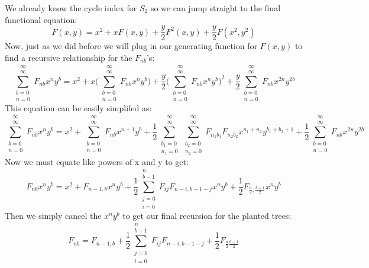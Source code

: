 \documentclass{article}
\begin{document}
We already know the cycle index for \(S_2\) so we can jump straight to the final functional equation:
\begin{equation}
F(x,y)=x^2+ xF(x,y)+\frac{y}{2}F^2(x,y)+\frac{y}{2}F(x^2,y^2)
\end{equation}
Now, just as we did before we will plug in our generating function for \(F(x,y)\) to find a recursive relationship for the \(F_{nb}\)'s:
\begin{equation}
\sum_{\substack{b=0\\n=0}}^{\substack{\infty\\ \infty}} F_{nb} x^ny^b =x^2+ x\Bigg(\sum_{\substack{b=0\\n=0}}^{\substack{\infty\\ \infty}} F_{nb} x^ny^b\Bigg)+\frac{y}{2}\Bigg(\sum_{\substack{b=0\\n=0}}^{\substack{\infty\\ \infty}} F_{nb} x^ny^b\Bigg)^2+\frac{y}{2}\sum_{\substack{b=0\\n=0}}^{\substack{\infty\\ \infty}} F_{nb} x^{2n}y^{2b}
\end{equation} 
This equation can be easily simplifed as:
\begin{equation}
\sum_{\substack{b=0\\n=0}}^{\substack{\infty\\ \infty}} F_{nb} x^ny^b =x^2+ \sum_{\substack{b=0\\n=0}}^{\substack{\infty\\ \infty}} F_{nb} x^{n+1}y^b+\frac{1}{2}\sum_{\substack{b_1=0\\n_1=0}}^{\substack{\infty\\ \infty}}\sum_{\substack{b_2=0\\n_2=0}}^{\substack{\infty\\ \infty}} F_{n_1b_1}F_{n_2b_2} x^{n_1+n_2}y^{b_1+b_2+1}+\frac{1}{2}\sum_{\substack{b=0\\n=0}}^{\substack{\infty\\ \infty}} F_{nb} x^{2n}y^{2b}
\end{equation}
Now we must equate like powers of x and y to get:
\begin{equation}
 F_{nb} x^ny^b =x^2+  F_{n-1,b} x^ny^b+\frac{1}{2}\sum_{\substack{j=0\\i=0}}^{\substack{n\\ b-1}} F_{ij}F_{n-i,b-1-j} x^ny^b+\frac{1}{2} F_{\frac{n}{2},\frac{b-1}{2}} x^ny^b
\end{equation}
Then we simply cancel the \(x^ny^b\) to get our final recursion for the planted trees:
\begin{equation}
 F_{nb}  =F_{n-1,b}+\frac{1}{2}\sum_{\substack{j=0\\i=0}}^{\substack{n\\ b-1}} F_{ij}F_{n-i,b-1-j}+\frac{1}{2} F_{\frac{n}{2}\frac{b-1}{2}}
\end{equation}
\end{document}
